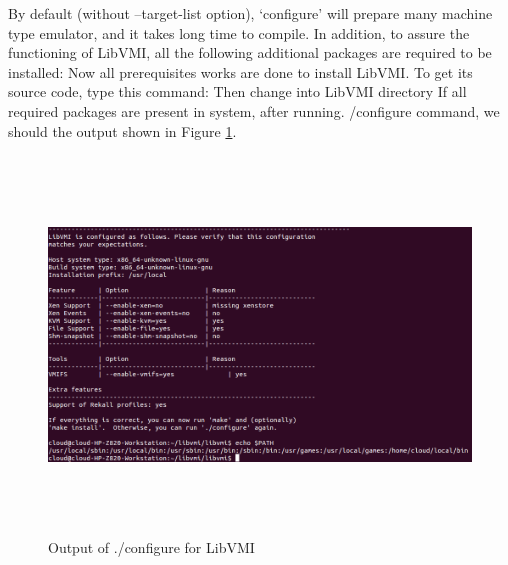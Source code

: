 By default (without –target-list option), ‘configure’ will prepare many machine type emulator, and it takes long time to compile.
In addition, to assure the functioning of LibVMI, all the following additional packages are required to be installed:
Now all prerequisites works are done to install LibVMI. To get its source code, type this command:
Then change into LibVMI directory
If all required packages are present in system, after running. /configure command, we should the output shown in Figure 
\ref{fig:Output of ./configure for LibVMI}.
\begin{figure}[htbp]
	\centering
		\includegraphics[width=14cm, height= 10cm ]{Figures/Figure21.png}
	\caption[Output of ./configure for LibVMI]{Output of ./configure for LibVMI}
	\label{fig:Output of ./configure for LibVMI}
\end{figure}

